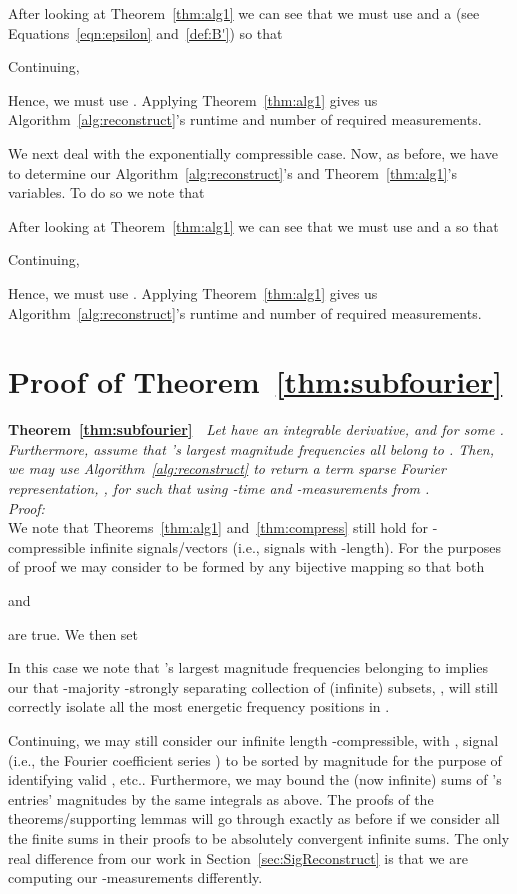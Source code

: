 \documentclass{article}
\begin{document}
After looking at Theorem~\ref{thm:alg1} we can see that we must use  and a  (see Equations~\ref{eqn:epsilon} and~\ref{def:B'}) so that

Continuing,

Hence, we must use .  Applying Theorem~\ref{thm:alg1} gives us Algorithm~\ref{alg:reconstruct}'s runtime and number of required measurements.

We next deal with the exponentially compressible case.  Now, as before, we have to determine our Algorithm~\ref{alg:reconstruct}'s  and Theorem~\ref{thm:alg1}'s  variables.  To do so we note that

After looking at Theorem~\ref{thm:alg1} we can see that we must use  and a  so that

Continuing,

Hence, we must use .  Applying Theorem~\ref{thm:alg1} gives us Algorithm~\ref{alg:reconstruct}'s runtime and number of required measurements.~~ \\

\section{Proof of Theorem~\ref{thm:subfourier}}

\noindent \textbf{Theorem~\ref{thm:subfourier}}~~\textit{Let  have  an integrable  derivative, and   for some .  Furthermore, assume that 's  largest magnitude frequencies all belong to .  Then, we may use Algorithm~\ref{alg:reconstruct} to return a  term sparse Fourier representation, , for  such that  using -time and -measurements from .}\\

\noindent \textit{Proof:} \\

We note that Theorems~\ref{thm:alg1} and~\ref{thm:compress} still hold for -compressible infinite signals/vectors  (i.e., signals with -length).  For the purposes of proof we may consider  to be formed by any bijective mapping  so that both

and

are true.  We then set

In this case we note that 's  largest magnitude frequencies belonging to  implies our that -majority -strongly separating collection of (infinite) subsets, , will still correctly isolate all the  most energetic frequency positions in .

Continuing, we may still consider our infinite length -compressible, with , signal  (i.e., the Fourier coefficient series ) to be sorted by magnitude for the purpose of identifying valid , etc.. Furthermore, we may bound the (now infinite) sums of 's entries' magnitudes by the same integrals as above.  The proofs of the theorems/supporting lemmas will go through exactly as before if we consider all the finite sums in their proofs to be absolutely convergent infinite sums.  The only real difference from our work in Section~\ref{sec:SigReconstruct} is that we are computing our -measurements differently.
\end{document}
